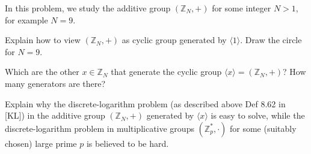 \documentclass[a4paper,10pt,landscape,twocolumn]{scrartcl}
\begin{document}
\begin{exercise}
In this problem, we study the additive group $(\mathbb{Z}_N, +)$ for
some integer $N>1$, for example $N=9$.

\begin{subex}
  Explain how to view $(\mathbb{Z}_N, +)$ as cyclic group generated by
  $\langle 1\rangle$. Draw the circle for $N=9$.
\end{subex}

\begin{subex}
Which are the other $x \in \mathbb{Z}_N$ that generate the cyclic
group $\langle x \rangle = (\mathbb{Z}_N, +)$? How many generators are there?
\end{subex}

\begin{subex}
Explain why the discrete-logarithm problem (as described above Def 8.62
in [KL]) in the additive group
$(\mathbb{Z}_N, +)$ generated by $\langle x \rangle$ is easy to
solve, while the discrete-logarithm problem in multiplicative groups
$(\mathbb{Z}_p^*,\cdot)$ for some (suitably chosen) large prime $p$ is believed to be hard.

\end{subex}


\end{exercise}


%


\end{document}
